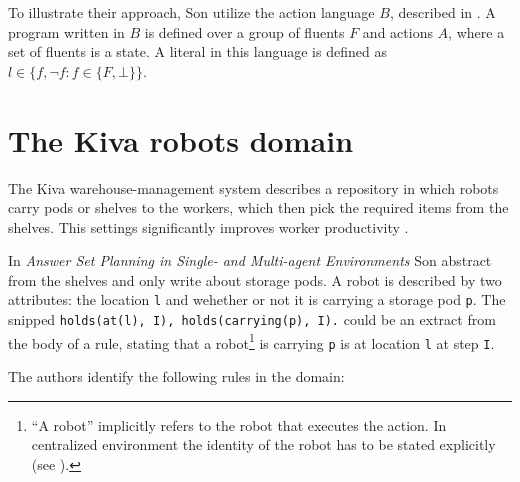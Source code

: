 \documentclass[runningheads]{llncs}
\newcommand{\papertitle}{Answer Set Planning in Single- and Multi-agent Environments}
\newcommand{\authorquote}{Son \etal}
\begin{document}
To illustrate their approach, \authorquote{} utilize the action language $B$, described in \cite{gelfond1998action}. A program written in $B$ is defined over a group of fluents $F$ and actions $A$, where a set of fluents is a state. A literal in this language is defined as $l \in \{f, \neg f : f \in  \{F, \bot\} \}$.






\section{The Kiva robots domain} \label{8:sec:kiva}


The Kiva warehouse-management system describes a repository in which robots carry pods or shelves to the workers, which then pick the required items from the shelves. This settings significantly improves worker productivity \cite{wurman2008coordinating}.

In \textit{\papertitle{}} \authorquote{} abstract from the shelves and only write about storage pods. A robot is described by two attributes: the location \verb|l| and wehether or not it is  carrying a storage pod \verb|p|. The snipped \verb|holds(at(l), I), holds(carrying(p), I).| could be an extract from the body of a rule, stating that a robot\footnote{``A robot'' implicitly refers to the robot that executes the action. In centralized environment the identity of the robot has to be stated explicitly (see ).} is carrying \verb|p| is at location \verb|l| at step \verb|I|.

The authors identify the following rules in the domain:
\end{document}
